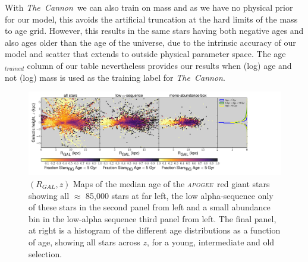 \documentclass[12pt, preprint]{aastex}
\newcommand{\project}[1]{\textsl{#1}}
\newcommand{\tc}{\project{The~Cannon}}
\newcommand{\apogee}{\project{\textsc{apogee}}}
\begin{document}
With \tc\ we can also train on mass and as we have no physical prior for our model, this avoids the artificial truncation at the hard limits of the mass to age grid. However, this results in the same stars having both negative ages and also ages older than the age of the universe, due to the intrinsic accuracy of our model and scatter that extends to outside physical parameter space. The age$_{trained}$ column of our table nevertheless provides our results when (log) age and not (log) mass is used as the training label for \tc.

\begin{figure}[p]
\centering
              \includegraphics[scale=0.43]{./plots/agealphamap_testcm_rg.pdf}
    \caption{$(R_{GAL},z)$ Maps of the median age of the \apogee\  red giant stars showing all $\approx$ 85,000 stars at far left, the low alpha-sequence only of these stars in the second panel from left and a small abundance bin in the low-alpha sequence third panel from left. The final panel, at right is a histogram of the different age distributions as a function of age, showing all stars across $z$, for a young, intermediate and old selection.  }
\label{fig:allage}
\end{figure}
\end{document}
